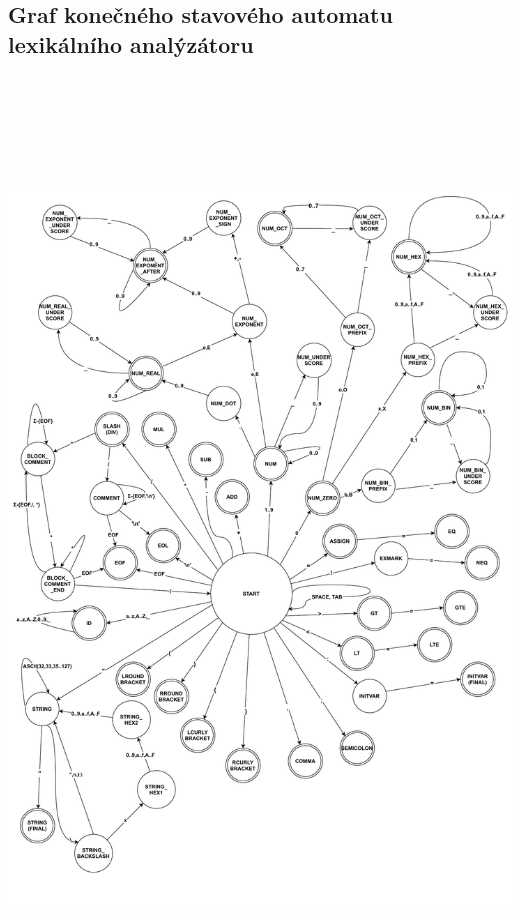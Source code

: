 \documentclass[a4paper, 12pt]{article}
\begin{document}
\subsection{Graf konečného stavového automatu lexikálního analýzátoru}
\includegraphics[height=25cm,keepaspectratio]{Scanner_FSM_Graph.pdf}
\restoregeometry
\end{document}
